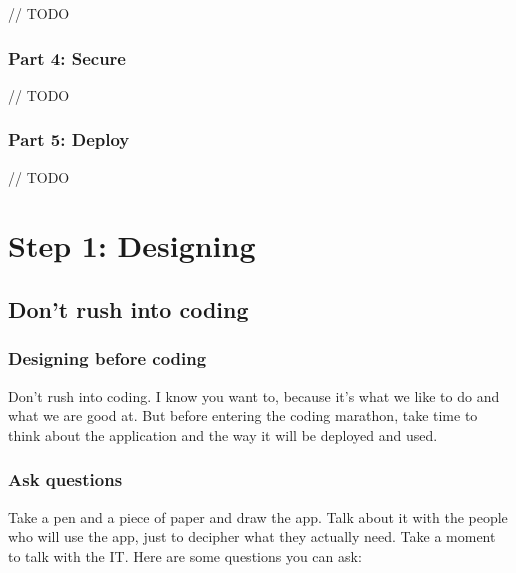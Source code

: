 \documentclass[]{book}
\begin{document}
// TODO

\hypertarget{part-4-secure}{%
\section{Part 4: Secure}\label{part-4-secure}}

// TODO

\hypertarget{part-5-deploy}{%
\section{Part 5: Deploy}\label{part-5-deploy}}

// TODO

\hypertarget{part-step-1-designing}{%
\part{Step 1: Designing}\label{part-step-1-designing}}

\hypertarget{step-design}{%
\chapter{Don't rush into coding}\label{step-design}}

\hypertarget{designing-before-coding}{%
\section{Designing before coding}\label{designing-before-coding}}

Don't rush into coding. I know you want to, because it's what we like to do and what we are good at. But before entering the coding marathon, take time to think about the application and the way it will be deployed and used.

\hypertarget{ask-questions}{%
\section{Ask questions}\label{ask-questions}}

Take a pen and a piece of paper and draw the app. Talk about it with the people who will use the app, just to decipher what they actually need. Take a moment to talk with the IT. Here are some questions you can ask:
\end{document}
